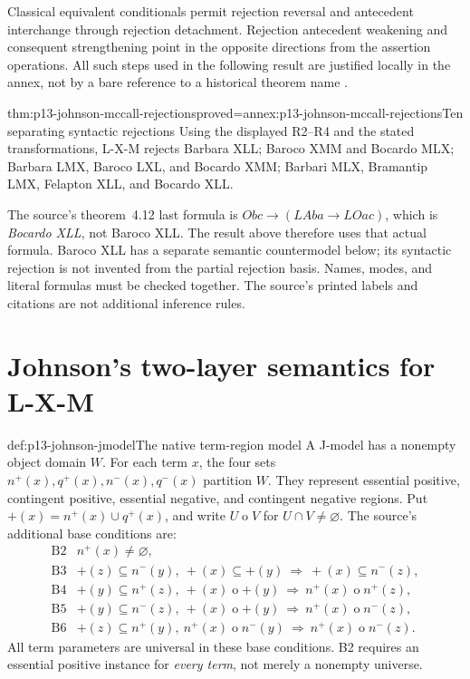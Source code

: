 Classical equivalent conditionals permit rejection reversal and antecedent
interchange through rejection detachment. Rejection antecedent weakening and
consequent strengthening point in the opposite directions from the assertion
operations. All such steps used in the following result are justified locally
in the annex, not by a bare reference to a historical theorem name
\parencite[pp.~253--254, 266, 270--271]{Johnson2004ModalSyllogisms}.

\begin{hbtheorem}{thm:p13-johnson-mccall-rejections}{proved=annex:p13-johnson-mccall-rejections}{Ten separating syntactic rejections}
Using the displayed R2--R4 and the stated transformations, L-X-M rejects
Barbara XLL; Baroco XMM and Bocardo MLX; Barbara LMX, Baroco LXL,
and Bocardo XMM; Barbari MLX, Bramantip LMX, Felapton XLL, and Bocardo XLL.
\end{hbtheorem}

The source's theorem~4.12 last formula is
\(Obc\to(LAba\to LOac)\), which is \emph{Bocardo XLL}, not Baroco XLL.
The result above therefore uses that actual formula. Baroco XLL has a separate
semantic countermodel below; its syntactic rejection is not invented from
the partial rejection basis. Names, modes, and literal formulas must be
checked together. The source's printed labels and citations are not
additional inference rules.

\section{Johnson's two-layer semantics for L-X-M}
\label{sec:p13-johnson-mccall-semantics}

\begin{hbdefinition}{def:p13-johnson-jmodel}{The native term-region model}
A J-model has a nonempty object domain \(W\). For each term \(x\), the four
sets \(n^{+}(x),q^{+}(x),n^{-}(x),q^{-}(x)\) partition \(W\).
They represent essential positive, contingent positive, essential negative,
and contingent negative regions. Put
\(+(x)=n^{+}(x)\cup q^{+}(x)\), and write \(U\mathbin{o}V\) for
\(U\cap V\ne\varnothing\). The source's additional base conditions are:
\[
\begin{array}{ll}
\mathrm{B2}&n^{+}(x)\ne\varnothing,\\
\mathrm{B3}&+(z)\subseteq n^{-}(y),\ +(x)\subseteq +(y)
              \ \Longrightarrow\ +(x)\subseteq n^{-}(z),\\
\mathrm{B4}&+(y)\subseteq n^{+}(z),\ +(x)\mathbin{o}+(y)
              \ \Longrightarrow\ n^{+}(x)\mathbin{o}n^{+}(z),\\
\mathrm{B5}&+(y)\subseteq n^{-}(z),\ +(x)\mathbin{o}+(y)
              \ \Longrightarrow\ n^{+}(x)\mathbin{o}n^{-}(z),\\
\mathrm{B6}&+(z)\subseteq n^{+}(y),\ n^{+}(x)\mathbin{o}n^{-}(y)
              \ \Longrightarrow\ n^{+}(x)\mathbin{o}n^{-}(z).
\end{array}
\]
All term parameters are universal in these base conditions. B2 requires an
essential positive instance for \emph{every term}, not merely a nonempty universe.
\end{hbdefinition}

